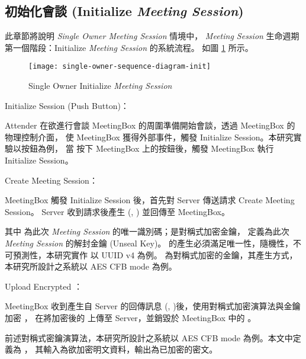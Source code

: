 \subsection{初始化會談 (Initialize {\it Meeting Session})}
\label{subsec.initialize}

    此章節將說明 {\it Single Owner Meeting Session} 情境中，
{\it Meeting Session} 生命週期第一個階段：Initialize {\it Meeting Session} 的系統流程。
如圖 \ref{fig.s-o-init} 所示。

\begin{figure}[H]
    \centering
    \texttt{[image: single-owner-sequence-diagram-init]}
    \caption{Single Owner Initialize {\it Meeting Session}}
    \label{fig.s-o-init}
\end{figure}

\begin{steps}
    \item Initialize Session (Push Button)：

            Attender 在欲進行會談 MeetingBox 的周圍準備開始會談，\DEFattender 透過 MeetingBox 的物理控制介面，
        使 MeetingBox 獲得外部事件，觸發 Initialize Session。本研究實驗以按鈕為例，
        當 \DEFattender 按下 MeetingBox 上的按鈕後，觸發 MeetingBox 執行 Initialize Session。

    \item Create Meeting Session：

            MeetingBox 觸發 Initialize Session 後，首先對 Server 傳送請求 Create Meeting Session。
        Server 收到請求後產生 (\DEFsessionID, \DEFunsealKey) 並回傳至 MeetingBox。

            其中 \DEFsessionID 為此次 {\it Meeting Session} 的唯一識別碼；\DEFunsealKey 是對稱式加密金鑰，
        定義為此次 {\it Meeting Session} 的解封金鑰 (Unseal Key)。
        \DEFsessionID 的產生必須滿足唯一性，隨機性，不可預測性，本研究實作 \DEFsessionID 以 UUID v4 為例。
        \DEFunsealKey 為對稱式加密的金鑰，其產生方式，本研究所設計之系統以 AES CFB mode 為例。

    \item Upload Encrypted \DEFrecN：

            MeetingBox 收到產生自 Server 的回傳訊息 (\DEFsessionID, \DEFunsealKey)後，使用對稱式加密演算法與金鑰 \DEFunsealKey 加密 \DEFrecN，
        在將加密後的 \DEFrecN 上傳至 Server，並銷毀於 MeetingBox 中的 \DEFunsealKey。

            前述對稱式密鑰演算法，本研究所設計之系統以 AES CFB mode 為例。本文中定義為 \DEFfuncEncEK，
        其輸入為欲加密明文資料，輸出為已加密的密文。


\end{steps}
